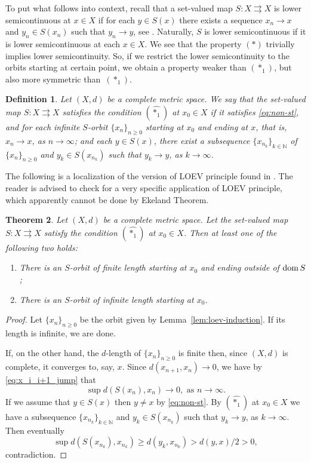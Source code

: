 \documentclass[12pt]{article}
\newtheorem{theorem}{Theorem}[section]
\newtheorem{definition}[theorem]{Definition}
\def\dom{\mathop{\rm dom}}
\newcommand{\astone}{(\ast_1)}
\newcommand{\astonehat}{\left(\widehat{\ast_1}\right)}
\begin{document}
    To put what follows into context, recall that a set-valued map $S:X\rightrightarrows X$ is lower semicontinuous at $x\in X$ if for each $y\in S(x)$ there exists a sequence $x_n\to x$ and $y_n\in S(x_n)$ such that $y_n\to y$, see \cite[p.39]{auf}. Naturally, $S$ is lower semicontinuous if it is lower semicontinuous at each $x\in X$. We see that the property $(\ast)$ trivially implies lower semicontinuity. So, if we restrict the lower semicontinuity to the orbits starting at certain point, we obtain a property weaker than $\astone$, but also more symmetric than~$\astone$.
    \begin{definition}
        \label{def:hat-st-1}
        Let $(X,d)$ be a complete metric space. We say that the set-valued map $S:X\rightrightarrows X$ satisfies the condition $\astonehat$ at $x_0\in X$ if it satisfies \eqref{eq:non-st}, and for each infinite $S$-orbit $\{x_n\}_{n\ge0}$ starting at $x_0$ and ending at $x$, that is, $x_n\to x$, as $n\to\infty$; and each $y\in S(x)$, there exist a subsequence $\{x_{n_k}\}_{k\in\mathbb N}$ of $\{x_n\}_{n\ge0}$ and $y_k\in S(x_{n_k})$ such that $y_k\to y$, as $k\to\infty$.
    \end{definition}
    The following is a localization of the version of LOEV principle found in \cite{plr}. The reader is advised to check  \cite{plr} for a very specific application of LOEV principle, which apparently cannot be done by Ekeland Theorem.
    \begin{theorem}
        \label{thm:loev-cmp}
        Let $(X,d)$ be a complete metric space. Let the set-valued map $S:X\rightrightarrows X$ satisfy the condition $\astonehat$ at $x_0\in X$. Then at least one of the following two holds:
        \begin{enumerate}
            \item[(a)] There is an $S$-orbit of finite length starting at $x_0$ and ending outside of $\dom S$;
            \item[(b)] There is an $S$-orbit of infinite length starting at $x_0$.
        \end{enumerate}
    \end{theorem}
    \begin{proof}
        Let $\{x_n\}_{n\ge0}$ be the orbit given by Lemma~\ref{lem:loev-induction}. If its length is infinite, we are done.

        If, on the other hand, the $d$-length of $\{x_n\}_{n\ge0}$ is finite then, since $(X,d)$ is complete, it converges to, say, $x$. Since $d(x_{n+1},x_n)\to0$, we have by \eqref{eq:x_i_i+1_jump} that
        $$
            \sup d(S(x_n),x_n) \to 0,\text{ as }n\to\infty.
        $$
        If we assume that $y\in S(x)$ then $y\neq x$ by \eqref{eq:non-st}. By $\astonehat$ at $x_0\in X$ we have a subsequence $\{x_{n_k}\}_{k\in\mathbb N}$ and  $y_k\in S(x_{n_k})$ such that $y_k\to y$, as $k\to\infty$. Then eventually
        $$
            \sup d(S(x_{n_k}),x_{n_k}) \ge d(y_k, x_{n_k}) > d(y,x)/2 >0,
        $$
        contradiction.
    \end{proof}
\end{document}
